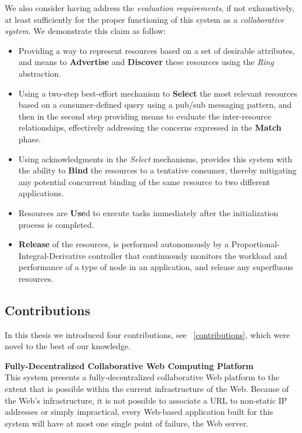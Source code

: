 \documentclass[12pt, titlepage]{uo_temp}
\begin{document}
     We also consider having address the \emph{evaluation requirements}, if not
     exhaustively, at least sufficiently for the proper functioning of this system as a
     \emph{collaborative system}. We demonstrate this claim  as follow:
     \begin{itemize}
       \item Providing a way to represent resources based on a set of desirable
         attributes, and means to \textbf{Advertise} and \textbf{Discover} these resources
         using the \emph{Ring} abstraction.
       \item Using a two-step best-effort mechanism to \textbf{Select} the most relevant
         resources based on a consumer-defined query using a pub/sub messaging pattern,
         and then in the second step providing means to evaluate the inter-resource
         relationships, effectively addressing the concerns expressed in the
         \textbf{Match} phase.
       \item Using acknowledgments in the \emph{Select} mechanisms, provides this system
         with the ability to \textbf{Bind} the resources to a tentative consumer, thereby
         mitigating any potential concurrent binding of the same resource to two different
         applications.
       \item Resources are \textbf{Use}d to execute tasks immediately after the
         initialization process is completed.
       \item \textbf{Release} of the resources, is performed autonomously by a
         Proportional-Integral-Derivative controller that continuously monitors the
         workload and performance of a type of node in an application, and release any
         superfluous resources.
     \end{itemize}

     \subsection{Contributions}
     In this thesis we introduced four contributions, see ~\ref{contributions}, which were
     novel to the best of our knowledge.

     \textbf{Fully-Decentralized Collaborative Web Computing Platform}\\
     This system presents a fully-decentralized collaborative Web platform to the extent
     that is possible within the current infrastructure of the Web. Because of the Web's
     infrastructure, it is not possible to associate a URL to non-static IP addresses or
     simply impractical, every Web-based application built for this system will have at
     most one single point of failure, the Web server.
\end{document}
